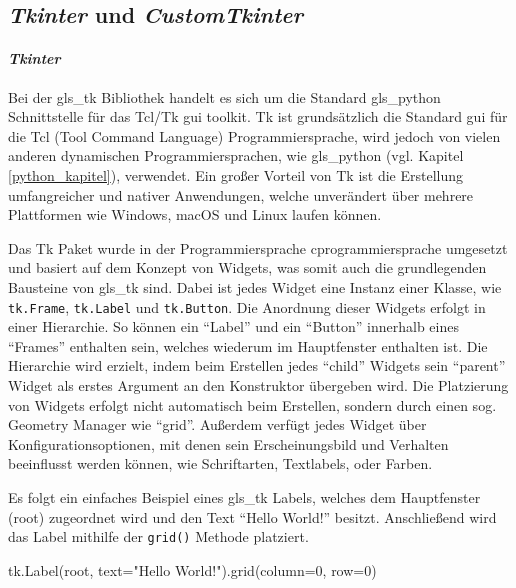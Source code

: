 \subsection{\textit{Tkinter} und \textit{CustomTkinter}}\label{tkinter_kapitel}
\paragraph{\textit{Tkinter}}\label{tk_kapitel}
Bei der \gls{gls_tk} Bibliothek handelt es sich um die Standard \gls{gls_python} Schnittstelle für das Tcl/Tk \ac{gui} toolkit. Tk ist grundsätzlich die Standard \acs{gui} für die Tcl (Tool Command Language) Programmiersprache, wird jedoch von vielen anderen dynamischen Programmiersprachen, wie \zB \gls{gls_python} (vgl. Kapitel \ref{python_kapitel}), verwendet. Ein großer Vorteil von Tk ist die Erstellung umfangreicher und nativer Anwendungen, welche unverändert über mehrere Plattformen wie Windows, macOS und Linux laufen können. \cite[vgl.][]{Python_Software_Foundation_Tk:o.J., Tcl_Developer_Xchange:o.J.}

Das Tk Paket wurde in der Programmiersprache \gls{cprogrammiersprache} umgesetzt und basiert auf dem Konzept von Widgets, was somit auch die grundlegenden Bausteine von \gls{gls_tk} sind. Dabei ist jedes Widget eine Instanz einer Klasse, wie \zB \lstinline{tk.Frame}, \lstinline{tk.Label} und \lstinline{tk.Button}. Die Anordnung dieser Widgets erfolgt in einer Hierarchie. So können \zB ein \enquote{Label} und ein \enquote{Button} innerhalb eines \enquote{Frames} enthalten sein, welches wiederum im Hauptfenster enthalten ist. Die Hierarchie wird erzielt, indem beim Erstellen jedes \enquote{child} Widgets sein \enquote{parent} Widget als erstes Argument an den Konstruktor übergeben wird. Die Platzierung von Widgets erfolgt nicht automatisch beim Erstellen, sondern durch einen sog. Geometry Manager wie \enquote{grid}. Außerdem verfügt jedes Widget über Konfigurationsoptionen, mit denen sein Erscheinungsbild und Verhalten beeinflusst werden können, wie \zB Schriftarten, Textlabels, oder Farben. \cite[vgl.][]{Python_Software_Foundation_Tk:o.J., Shipman:2013}

Es folgt ein einfaches Beispiel eines \gls{gls_tk} Labels, welches dem Hauptfenster (root) zugeordnet wird und den Text \enquote{Hello World!} besitzt. Anschließend wird das Label mithilfe der \lstinline{grid()} Methode platziert. 
\begin{pythoncode}
tk.Label(root, text="Hello World!").grid(column=0, row=0)
\end{pythoncode}

